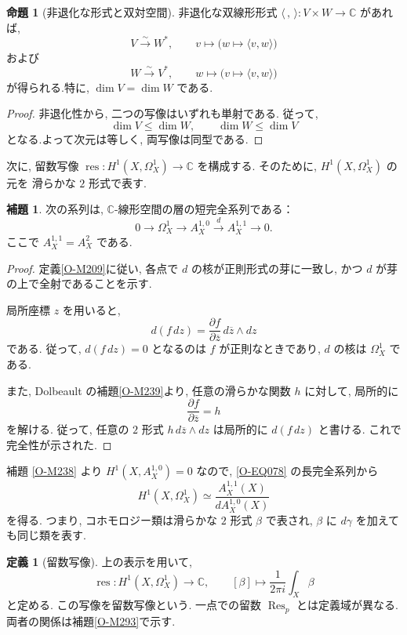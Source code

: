 \documentclass[dvipdfmx,a4paper,11pt]{article} %
\newcommand{\C}{\mathbb{C}}
\theoremstyle{definition}
\numberwithin{equation}{section}
\newtheorem{lem}[thm]{補題}
\newtheorem{prop}[thm]{命題}
\newtheorem{dfn}[thm]{定義}
\begin{document}
\begin{prop}[非退化な形式と双対空間]\label{O-M288}
非退化な双線形形式
$\langle\, ,\,\rangle:V\times W\to\C$ があれば, 
\[
V\xrightarrow{\sim}W^*,
\qquad v\longmapsto\bigl(w\mapsto\langle v,w\rangle\bigr)
\]
および
\[
W\xrightarrow{\sim}V^*,
\qquad w\longmapsto\bigl(v\mapsto\langle v,w\rangle\bigr)
\]
が得られる.特に, $\dim V=\dim W$ である.
\end{prop}

\begin{proof}
非退化性から, 二つの写像はいずれも単射である.
従って, 
\[
\dim V\leq\dim W,\qquad \dim W\leq\dim V
\]
となる.よって次元は等しく, 両写像は同型である.
\end{proof}


次に, 留数写像
\(
\operatorname{res}:H^1(X,\Omega_X^1)\longrightarrow\C
\)
を構成する.
そのために, $H^1(X,\Omega_X^1)$ の元を
滑らかな $2$ 形式で表す.

\begin{lem}\label{O-M290}
次の系列は, $\C$-線形空間の層の短完全系列である：
\begin{equation}\label{O-EQ078}
0\longrightarrow\Omega_X^1
\longrightarrow A_X^{1,0}
\xrightarrow{d}A_X^{1,1}
\longrightarrow0.
\end{equation}
ここで $A_X^{1,1}=A_X^2$ である.
\end{lem}

\begin{proof}
定義\ref{O-M209}に従い, 各点で $d$ の核が正則形式の芽に一致し, かつ $d$ が芽の上で全射であることを示す.

局所座標 $z$ を用いると, 
\[
d(f\,dz)
=\frac{\partial f}{\partial\overline z}
\,d\overline z\wedge dz
\]
である.
従って, $d(f\,dz)=0$ となるのは $f$ が正則なときであり, 
$d$ の核は $\Omega_X^1$ である.

また, Dolbeault の補題\ref{O-M239}より, 
任意の滑らかな関数 $h$ に対して, 局所的に
\[
\frac{\partial f}{\partial\overline z}=h
\]
を解ける.
従って, 任意の $2$ 形式
$h\,d\overline z\wedge dz$ は局所的に $d(f\,dz)$ と書ける.
これで完全性が示された.
\end{proof}

補題 \ref{O-M238} より
$H^1(X,A_X^{1,0})=0$ なので, 
\eqref{O-EQ078} の長完全系列から
\[
H^1(X,\Omega_X^1)
\simeq
\frac{A_X^{1,1}(X)}{dA_X^{1,0}(X)}
\]
を得る.
つまり, コホモロジー類は滑らかな $2$ 形式 $\beta$ で表され, 
$\beta$ に $d\gamma$ を加えても同じ類を表す.

\begin{dfn}[留数写像]\label{O-M291}
上の表示を用いて, 
\[
\operatorname{res}:H^1(X,\Omega_X^1)\longrightarrow\C,
\qquad
[\beta]\longmapsto\frac{1}{2\pi i}\int_X\beta
\]
と定める. この写像を留数写像という. 一点での留数 $\operatorname{Res}_p$ とは定義域が異なる. 両者の関係は補題\ref{O-M293}で示す.
\end{dfn}
\end{document}
